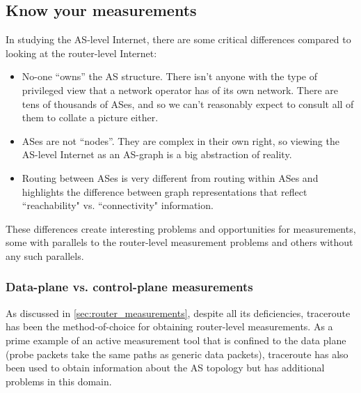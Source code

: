 

\subsection{Know your measurements}
\label{sec:as_measurement} 

In studying the AS-level Internet, there are some critical differences compared 
to looking at the router-level Internet:

\begin{itemize}

\item No-one ``owns'' the AS structure. There isn't anyone with the type of 
privileged view that a network operator has of its own network. There are 
tens of thousands of ASes, and so we can't reasonably expect to consult all 
of them to collate a picture either.

\item ASes are not ``nodes''. They are complex in their own right, so viewing 
the AS-level Internet as an AS-graph is a big abstraction of reality.

\item Routing between ASes is very different from routing within ASes and 
highlights the difference between graph representations that 
reflect ``reachability" vs. ``connectivity" information.

\end{itemize}

These differences create interesting problems and opportunities for
measurements, some with parallels to the router-level measurement
problems and others without any such parallels.

\subsubsection{Data-plane vs. control-plane measurements}

As discussed in \autoref{sec:router_measurements}, despite all its
deficiencies, traceroute has been the method-of-choice for obtaining
router-level measurements. As a prime example of an active measurement
tool that is confined to the data plane (\ie probe packets take the
same paths as generic data packets), traceroute has also been used to
obtain information about the AS topology but has additional problems
in this domain.

